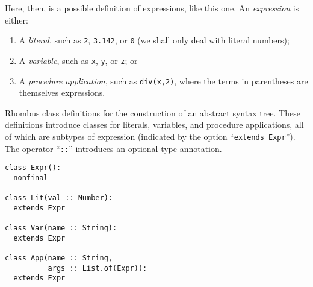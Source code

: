 \documentclass[11pt, a4paper]{article}
\newcommand{\cd}[1]{\texttt{#1}}
\begin{document}
Here, then, is a possible definition of expressions, like this one. An
\emph{expression} is either:
\begin{enumerate}
\item A \emph{literal}, such as \cd{2}, \cd{3.142}, or \cd{0} (we
  shall only deal with literal numbers);
\item A \emph{variable}, such as \cd{x}, \cd{y}, or \cd{z}; or
\item A \emph{procedure application}, such as \cd{div(x,2)}, where the
  terms in parentheses are themselves expressions.
\end{enumerate}
\begin{marginfigure}
  \caption{Rhombus class definitions for the construction of an
    abstract syntax tree. These definitions introduce classes for
    literals, variables, and procedure applications, all of which are
    subtypes of expression (indicated by the option ``\cd{extends
      Expr}''). The operator ``\cd{::}'' introduces an optional type
    annotation.\label{fig:class-defs}}\footnotesize
\begin{verbatim}
class Expr():
  nonfinal

class Lit(val :: Number):
  extends Expr

class Var(name :: String):
  extends Expr

class App(name :: String,
          args :: List.of(Expr)):
  extends Expr
\end{verbatim}
\end{marginfigure}
\end{document}
